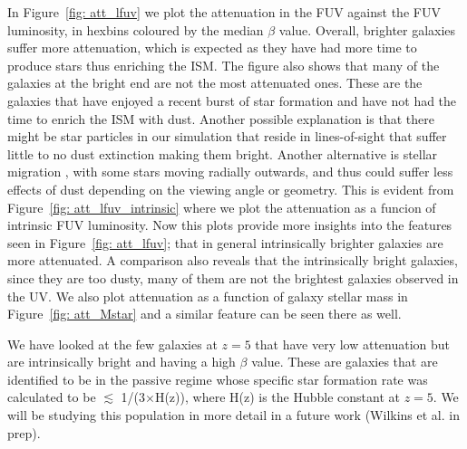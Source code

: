 In Figure~\ref{fig: att_lfuv} we plot the attenuation in the FUV against the FUV luminosity, in hexbins coloured by the median $\beta$ value. Overall, brighter galaxies suffer more attenuation, which is expected as they have had more time to produce stars thus enriching the ISM. The figure also shows that many of the galaxies at the bright end are not the most attenuated ones. These are the galaxies that have enjoyed a recent burst of star formation and have not had the time to enrich the ISM with dust. Another possible explanation is that there might be star particles in our simulation that reside in lines-of-sight that suffer little to no dust extinction making them bright. Another alternative is stellar migration \citep[see][]{furlong_evolution_2015}, with some stars moving radially outwards, and thus could suffer less effects of dust depending on the viewing angle or geometry. This is evident from Figure~\ref{fig: att_lfuv_intrinsic} where we plot the attenuation as a funcion of intrinsic FUV luminosity. Now this plots provide more insights into the features seen in Figure~\ref{fig: att_lfuv}; that in general intrinsically brighter galaxies are more attenuated. A comparison also reveals that the intrinsically bright galaxies, since they are too dusty, many of them are not the brightest galaxies observed in the UV. We also plot attenuation as a function of galaxy stellar mass in Figure~\ref{fig: att_Mstar} and a similar feature can be seen there as well. 

We have looked at the few galaxies at $z=5$ that have very low attenuation but are intrinsically bright and having a high $\beta$ value. These are galaxies that are identified to be in the passive regime whose specific star formation rate was calculated to be $\lesssim$ 1/(3$\times$H(z)), where H(z) is the Hubble constant at $z=5$. We will be studying this population in more detail in a future work (Wilkins et al. in prep). 

